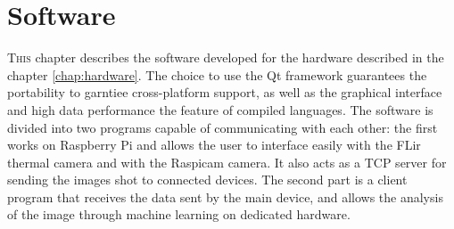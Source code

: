 \chapter{Software}
\label{chap:software}
%
\lettrine[lines=3]{T}{his} chapter describes the software developed for the
hardware described in the chapter \ref{chap:hardware}. The choice to use the Qt
framework guarantees the portability to garntiee cross-platform support, as well
as the graphical interface and high data performance the feature of compiled
languages.  The software is divided into two programs capable of communicating
with each other: the first works on Raspberry Pi and allows the user to
interface easily with the FLir thermal camera and with the Raspicam camera. It
also acts as a TCP server for sending the images shot to connected devices. The
second part is a client program that receives the data sent by the main device,
and allows the analysis of the image through machine learning on dedicated
hardware.
%


